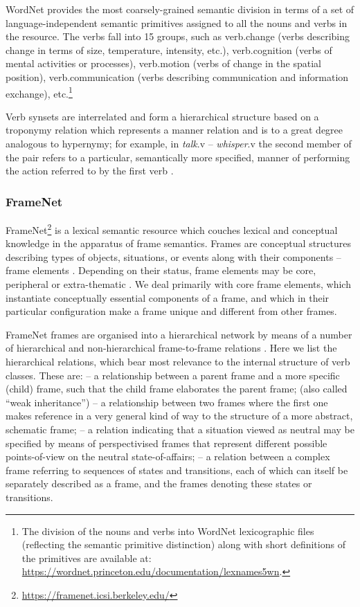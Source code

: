 \documentclass[output=paper,colorlinks,citecolor=brown]{langscibook}
\begin{document}
WordNet provides the most coarsely-grained semantic division in terms of a set of language-independent semantic primitives assigned to all the nouns and verbs in the resource. The verbs fall into 15 groups, such as verb.change (verbs describing change in terms of size, temperature, intensity, etc.), verb.cognition (verbs of mental activities or processes), verb.motion (verbs of change in the spatial position), verb.communication (verbs describing communication and information exchange), etc.\footnote{The division of the nouns and verbs into WordNet lexicographic files (reflecting the semantic primitive distinction) along with short definitions of the primitives are available at: \url{https://wordnet.princeton.edu/documentation/lexnames5wn}.}

Verb synsets are interrelated and form a hierarchical structure based on a troponymy relation which represents a manner relation and is to a great degree analogous to hypernymy; for example, in \textit{talk}.v – \textit{whisper}.v the second member of the pair refers to a particular, semantically more specified, manner of performing the action referred to by the first verb \citep{Fellbaum1999a}. 


\subsubsection{FrameNet}

FrameNet\footnote{\url{https://framenet.icsi.berkeley.edu/}}  \citep{Baker1998,Baker2008} is a lexical semantic resource which couches lexical and conceptual knowledge in the apparatus of frame semantics. Frames are conceptual structures describing types of objects, situations, or events along with their components -- frame elements \citep{Baker1998,Ruppenhofer2016}. Depending on their status, frame elements may be core, peripheral or extra-thematic \citep{Ruppenhofer2016}. We deal primarily with core frame elements, which instantiate conceptually essential components of a frame, and which in their particular configuration make a frame unique and different from other frames.

FrameNet frames are organised into a hierarchical network by means of a number of hierarchical and non-hierarchical frame-to-frame relations \citep[81--84]{Ruppenhofer2016}. Here we list the hierarchical relations, which bear most relevance to the internal structure of verb classes. These are:  – a relationship between a parent frame and a more specific (child) frame, such that the child frame elaborates the parent frame;  (also called “weak inheritance”) – a relationship between two frames where the first one makes reference in a very general kind of way to the structure of a more abstract, schematic frame;  – a relation indicating that a situation viewed as neutral may be specified by means of perspectivised frames that represent different possible points-of-view on the neutral state-of-affairs;  – a relation between a complex frame referring to sequences of states and transitions, each of which can itself be separately described as a frame, and the frames denoting these states or transitions. 
\end{document}

